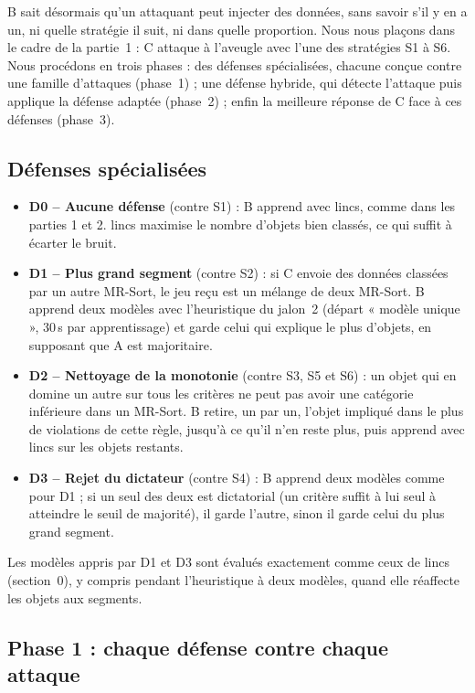 \documentclass[11pt,a4paper]{article}
\begin{document}
B sait désormais qu'un attaquant peut injecter des données, sans savoir s'il y en a un, ni quelle stratégie il
suit, ni dans quelle proportion. Nous nous plaçons dans le cadre de la partie~1 : C attaque à l'aveugle avec
l'une des stratégies S1 à S6. Nous procédons en trois phases : des défenses spécialisées, chacune conçue contre
une famille d'attaques (phase~1) ; une défense hybride, qui détecte l'attaque puis applique la défense adaptée
(phase~2) ; enfin la meilleure réponse de C face à ces défenses (phase~3).

\subsection{Défenses spécialisées}

\begin{itemize}
  \item \textbf{D0 -- Aucune défense} (contre S1) : B apprend avec lincs, comme dans les parties 1 et 2. lincs
        maximise le nombre d'objets bien classés, ce qui suffit à écarter le bruit.
  \item \textbf{D1 -- Plus grand segment} (contre S2) : si C envoie des données classées par un autre MR-Sort, le
        jeu reçu est un mélange de deux MR-Sort. B apprend deux modèles avec l'heuristique du jalon~2 (départ
        « modèle unique », 30\,s par apprentissage) et garde celui qui explique le plus d'objets, en supposant que
        A est majoritaire.
  \item \textbf{D2 -- Nettoyage de la monotonie} (contre S3, S5 et S6) : un objet qui en domine un autre sur
        tous les critères ne peut pas avoir une catégorie inférieure dans un MR-Sort. B retire, un par un, l'objet
        impliqué dans le plus de violations de cette règle, jusqu'à ce qu'il n'en reste plus, puis apprend avec
        lincs sur les objets restants.
  \item \textbf{D3 -- Rejet du dictateur} (contre S4) : B apprend deux modèles comme pour D1 ; si un seul des deux
        est dictatorial (un critère suffit à lui seul à atteindre le seuil de majorité), il garde l'autre, sinon il
        garde celui du plus grand segment.
\end{itemize}
Les modèles appris par D1 et D3 sont évalués exactement comme ceux de lincs (section~0), y compris pendant
l'heuristique à deux modèles, quand elle réaffecte les objets aux segments.

\subsection{Phase 1 : chaque défense contre chaque attaque}
\end{document}
